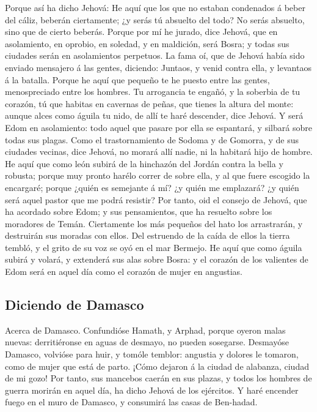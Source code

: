  Porque así ha dicho Jehová: He aquí que los que no estaban
condenados á beber del cáliz, beberán ciertamente; ¿y serás tú absuelto
del todo? No serás absuelto, sino que de cierto beberás. 
Porque por mí he jurado, dice Jehová, que en asolamiento, en oprobio, en
soledad, y en maldición, será Bosra; y todas sus ciudades serán en
asolamientos perpetuos.  La fama oí, que de Jehová había
sido enviado mensajero á las gentes, diciendo: Juntaos, y venid contra
ella, y levantaos á la batalla.  Porque he aquí que pequeño
te he puesto entre las gentes, menospreciado entre los hombres.
 Tu arrogancia te engañó, y la soberbia de tu corazón, tú
que habitas en cavernas de peñas, que tienes la altura del monte: aunque
alces como águila tu nido, de allí te haré descender, dice Jehová.
 Y será Edom en asolamiento: todo aquel que pasare por ella
se espantará, y silbará sobre todas sus plagas.  Como el
trastornamiento de Sodoma y de Gomorra, y de sus ciudades vecinas, dice
Jehová, no morará allí nadie, ni la habitará hijo de hombre.
 He aquí que como león subirá de la hinchazón del Jordán
contra la bella y robusta; porque muy pronto harélo correr de sobre
ella, y al que fuere escogido la encargaré; porque ¿quién es semejante á
mí? ¿y quién me emplazará? ¿y quién será aquel pastor que me podrá
resistir?  Por tanto, oid el consejo de Jehová, que ha
acordado sobre Edom; y sus pensamientos, que ha resuelto sobre los
moradores de Temán. Ciertamente los más pequeños del hato los
arrastrarán, y destruirán sus moradas con ellos.  Del
estruendo de la caída de ellos la tierra tembló, y el grito de su voz se
oyó en el mar Bermejo.  He aquí que como águila subirá y
volará, y extenderá sus alas sobre Bosra: y el corazón de los valientes
de Edom será en aquel día como el corazón de mujer en angustias.

\hypertarget{diciendo-de-damasco}{%
\subsection{Diciendo de Damasco}\label{diciendo-de-damasco}}

 Acerca de Damasco. Confundióse Hamath, y Arphad, porque
oyeron malas nuevas: derritiéronse en aguas de desmayo, no pueden
sosegarse.  Desmayóse Damasco, volvióse para huir, y tomóle
temblor: angustia y dolores le tomaron, como de mujer que está de parto.
 ¡Cómo dejaron á la ciudad de alabanza, ciudad de mi gozo!
 Por tanto, sus mancebos caerán en sus plazas, y todos los
hombres de guerra morirán en aquel día, ha dicho Jehová de los
ejércitos.  Y haré encender fuego en el muro de Damasco, y
consumirá las casas de Ben-hadad.

